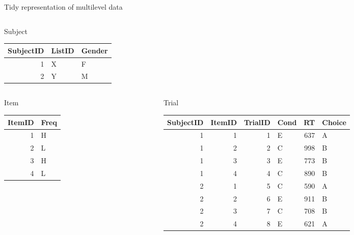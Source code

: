 \documentclass[presentation]{beamer}
\begin{document}
\begin{frame}[label={sec:orgdf48c7e}]{Tidy representation of multilevel data}
\begin{columns}
\begin{column}{.5\columnwidth}
\begin{block}{Subject}
\begin{scriptsize}

\begin{center}
\begin{tabular}{rll}
SubjectID & ListID & Gender\\
\hline
1 & X & F\\
2 & Y & M\\
\end{tabular}
\end{center}

\end{scriptsize}
\end{block}
\end{column}
\end{columns}

\begin{columns}
\begin{column}{.2\columnwidth}
\begin{block}{Item}
\begin{scriptsize}

\begin{center}
\begin{tabular}{rl}
ItemID & Freq\\
\hline
1 & H\\
2 & L\\
3 & H\\
4 & L\\
\end{tabular}
\end{center}

\end{scriptsize}
\end{block}
\end{column}

\begin{column}{.7\columnwidth}
\begin{block}{Trial}
\begin{scriptsize}

\begin{center}
\begin{tabular}{rrrlrl}
SubjectID & ItemID & TrialID & Cond & RT & Choice\\
\hline
1 & 1 & 1 & E & 637 & A\\
1 & 2 & 2 & C & 998 & B\\
1 & 3 & 3 & E & 773 & B\\
1 & 4 & 4 & C & 890 & B\\
2 & 1 & 5 & C & 590 & A\\
2 & 2 & 6 & E & 911 & B\\
2 & 3 & 7 & C & 708 & B\\
2 & 4 & 8 & E & 621 & A\\
\end{tabular}
\end{center}


\end{scriptsize}
\end{block}
\end{column}
\end{columns}
\end{frame}
\end{document}
